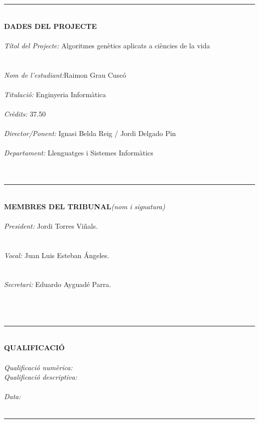 \documentclass[titlepage,a4paper,12pt]{book}
\begin{document}
\thispagestyle{empty}
\rule{160mm}{0.20mm}\\
\textbf{DADES DEL PROJECTE}\\
\\
\textit{Títol del Projecte:} Algoritmes genètics aplicats a ciències de la vida\\
\\
\\
\textit{Nom de l'estudiant:}Raimon Grau Cuscó\\
\\
\textit{Titulació:} Enginyeria Informàtica\\
\\
\textit{Crèdits:} 37.50 \\
\\
\textit{Director/Ponent:} Ignasi Belda Reig / Jordi Delgado Pin\\
\\
\textit{Departament:} Llenguatges i Sistemes Informàtics\\
\\
\\
\rule{160mm}{0.20mm}\\
\textbf{MEMBRES DEL TRIBUNAL}\textit{(nom i signatura)}\\
\\
\textit{President:} Jordi Torres Viñals.\\
\\
\\
\textit{Vocal:} Juan Luis Esteban Ángeles.\\
\\
\\
\textit{Secretari:} Eduardo Ayguadé Parra.\\
\\
\\
\\
\rule{160mm}{0.20mm}\\
\textbf{QUALIFICACIÓ}\\
\\
\textit{Qualificació numèrica:}\\
\textit{Qualificació descriptiva:}\\
\\
\textit{Data:}
\\
\\
\rule{160mm}{0.20mm}\\
\newpage{\pagestyle{empty}\cleardoublepage}
\end{document}
